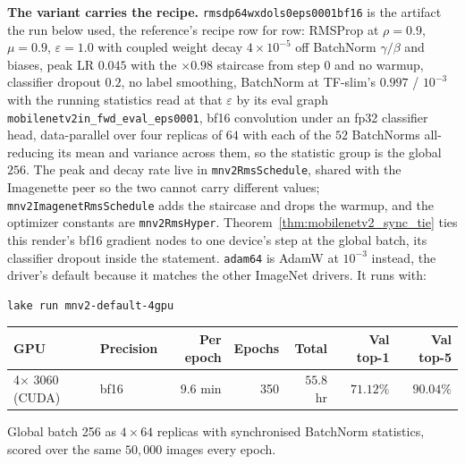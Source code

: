 \textbf{The variant carries the recipe.}
\texttt{rmsdp64wxdols0eps0001bf16} is the artifact the run below used, the
reference's recipe row for row: RMSProp at $\rho = 0.9$, $\mu = 0.9$,
$\varepsilon = 1.0$ with coupled weight decay $4 \times 10^{-5}$ off
BatchNorm $\gamma/\beta$ and biases, peak LR $0.045$ with the
$\times 0.98$ staircase from step $0$ and no warmup, classifier dropout
$0.2$, no label smoothing, BatchNorm at TF-slim's $0.997$ / $10^{-3}$
with the running statistics read at that $\varepsilon$ by its eval graph
\texttt{mobilenetv2in\_fwd\_eval\_eps0001}, bf16 convolution under an fp32
classifier head, data-parallel over four replicas of $64$ with each of the $52$ BatchNorms
all-reducing its mean and variance across them, so the statistic group is
the global $256$. The peak and decay rate live in \texttt{mnv2RmsSchedule},
shared with the Imagenette peer so the two cannot carry different values;
\texttt{mnv2ImagenetRmsSchedule} adds the staircase and drops the warmup,
and the optimizer constants are \texttt{mnv2RmsHyper}.
Theorem~\ref{thm:mobilenetv2_sync_tie} ties this render's bf16 gradient
nodes to one device's step at the global batch, its classifier dropout
inside the statement.
\texttt{adam64} is AdamW at $10^{-3}$ instead, the driver's default because
it matches the other ImageNet drivers. It runs with:

\begin{verbatim}
lake run mnv2-default-4gpu
\end{verbatim}

\begin{center}
\begin{tabular}{l l r r r r r}
\hline
GPU & Precision & Per epoch & Epochs & Total & Val top-1 & Val top-5 \\
\hline
4$\times$ 3060 (CUDA) & bf16 & $9.6$ min & 350 & $55.8$ hr & $\mathbf{71.12\%}$ & $\mathbf{90.04\%}$ \\
\hline
\end{tabular}
\end{center}

\noindent Global batch 256 as $4 \times 64$ replicas with synchronised
BatchNorm statistics, scored over the same $50{,}000$ images every epoch.



